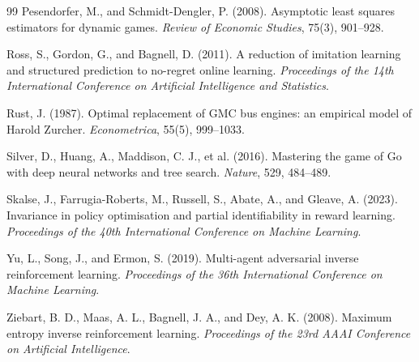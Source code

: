 \documentclass[11pt]{article}
\theoremstyle{definition}
\begin{document}
\begin{thebibliography}{99}
Pesendorfer, M., and Schmidt-Dengler, P. (2008). Asymptotic least squares estimators for dynamic games. \emph{Review of Economic Studies}, 75(3), 901--928.

Ross, S., Gordon, G., and Bagnell, D. (2011). A reduction of imitation learning and structured prediction to no-regret online learning. \emph{Proceedings of the 14th International Conference on Artificial Intelligence and Statistics}.

Rust, J. (1987). Optimal replacement of GMC bus engines: an empirical model of Harold Zurcher. \emph{Econometrica}, 55(5), 999--1033.

Silver, D., Huang, A., Maddison, C. J., et al. (2016). Mastering the game of Go with deep neural networks and tree search. \emph{Nature}, 529, 484--489.

Skalse, J., Farrugia-Roberts, M., Russell, S., Abate, A., and Gleave, A. (2023). Invariance in policy optimisation and partial identifiability in reward learning. \emph{Proceedings of the 40th International Conference on Machine Learning}.

Yu, L., Song, J., and Ermon, S. (2019). Multi-agent adversarial inverse reinforcement learning. \emph{Proceedings of the 36th International Conference on Machine Learning}.

Ziebart, B. D., Maas, A. L., Bagnell, J. A., and Dey, A. K. (2008). Maximum entropy inverse reinforcement learning. \emph{Proceedings of the 23rd AAAI Conference on Artificial Intelligence}.

\end{thebibliography}
\end{document}

